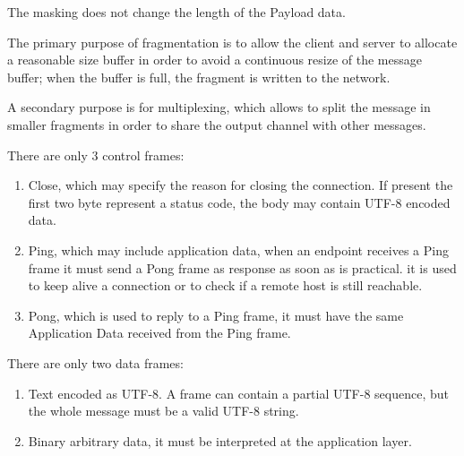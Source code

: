 The masking does not change the length of the Payload data.\newline

The primary purpose of fragmentation is to allow the client and server to allocate a reasonable size buffer in order to avoid a continuous resize of the message buffer; when the buffer is full, the fragment is written to the network.\newline

A secondary purpose is for multiplexing, which allows to split the message in smaller fragments in order to share the output channel with other messages.\newline

There are only 3 control frames:
\begin{enumerate}
	\item Close, which may specify the reason for closing the connection.
	If present the first two byte represent a status code, the body may contain UTF-8 encoded data.
	\item Ping, which may include application data, when an endpoint receives a Ping frame it must send a Pong frame as response as soon as is practical.
	it is used to keep alive a connection or to check if a remote host is still reachable.
	\item Pong, which is used to reply to a Ping frame, it must have the same Application Data received from the Ping frame.
\end{enumerate}

There are only two data frames:
\begin{enumerate}
	\item Text encoded as UTF-8.
	A frame can contain a partial UTF-8 sequence, but the whole message must be a valid UTF-8 string.
	\item Binary arbitrary data, it must be interpreted at the application layer.
\end{enumerate}

